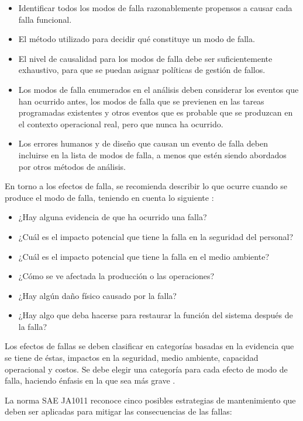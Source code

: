 \begin{itemize}
\item Identificar todos los modos de falla razonablemente propensos a causar cada falla funcional.
\item El método utilizado para decidir qué constituye un modo de falla.
\item El nivel de causalidad para los modos de falla debe ser suficientemente exhaustivo, para que se puedan asignar políticas de gestión de fallos.
\item Los modos de falla enumerados en el análisis deben considerar los eventos que han ocurrido antes, los modos de falla que se previenen en las tareas programadas existentes y otros eventos que es probable que se produzcan en el contexto operacional real, pero que nunca ha ocurrido.
\item Los errores humanos y de diseño que causan un evento de falla deben incluirse en la lista de modos de falla, a menos que estén siendo abordados por otros métodos de análisis.

\end{itemize}

En torno a los efectos de falla, se recomienda describir lo que ocurre cuando se produce el modo de falla, teniendo en cuenta lo siguiente \parencite{saeja1011}:\\

\begin{itemize}
\item ¿Hay alguna evidencia de que ha ocurrido una falla?
\item ¿Cuál es el impacto potencial que tiene la falla en la seguridad del personal?
\item ¿Cuál es el impacto potencial que tiene la falla en el medio ambiente?
\item ¿Cómo se ve afectada la producción o las operaciones?
\item ¿Hay algún daño físico causado por la falla?
\item ¿Hay algo que deba hacerse para restaurar la función del sistema después de la falla? 
\end{itemize}

Los efectos de fallas se deben clasificar en categorías basadas en la evidencia que se tiene de éstas, impactos en la seguridad, medio ambiente, capacidad operacional y costos. Se debe elegir una categoría para cada efecto de modo de falla, haciendo énfasis en la que sea más grave \parencite{sifonte2017}.

La norma SAE JA1011 reconoce cinco posibles estrategias de mantenimiento que deben ser aplicadas para mitigar las consecuencias de las fallas\parencite{sifonte2017}:\\

